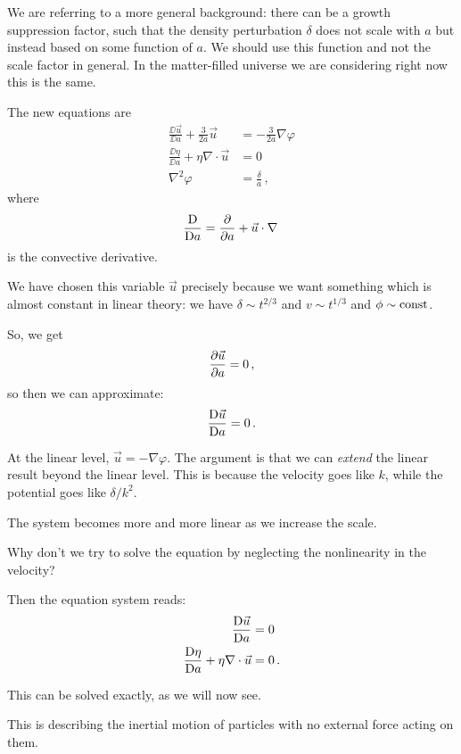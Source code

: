 \documentclass[main.tex]{subfiles}
\begin{document}
We are referring to a more general background: there can be a growth suppression factor, such that the density perturbation \(\delta \) does not scale with \(a\) but instead based on some function of \(a\). 
We should use this function and not the scale factor in general.
In the matter-filled universe we are considering right now this is the same.

The new equations are 
%
\begin{align}
\frac{ \DD \vec{u}}{\DD a} + \frac{3}{2a} \vec{u} &= - \frac{3}{2a} \nabla \varphi  \\
\frac{ \DD \eta }{\DD a} + \eta \nabla \cdot \vec{u} &= 0  \\
\nabla^2 \varphi &= \frac{\delta}{a}
\,,
\end{align}
%
where 
%
\begin{align}
\frac{\mathrm{D} }{\mathrm{D} a} = \pdv{}{a} + \vec{u} \cdot \nabla
\,
\end{align}
%
is the convective derivative.

We have chosen this variable \(\vec{u}\) precisely because we want something which is almost constant in linear theory: we have \(\delta \sim t^{2/3}\) and \(v \sim t^{1/3}\) and \(\phi \sim \text{const}\). 

So, we get 
%
\begin{align}
\pdv{\vec{u}}{a} = 0  
\,,
\end{align}
%
so then we can approximate:
%
\begin{align}
\frac{\mathrm{D} \vec{u}}{\mathrm{D} a} = 0 
\,.
\end{align}

At the linear level, \(\vec{u} = - \nabla \varphi \). 
The argument is that we can \emph{extend} the linear result beyond the linear level. This is because the velocity goes like \(k\), while the potential goes like \(\delta / k^2\).

The system becomes more and more linear as we increase the scale.

Why don't we try to solve the equation by neglecting the nonlinearity in the velocity? 

Then the equation system reads: 
%
\begin{align}
\frac{\mathrm{D} \vec{u}}{\mathrm{D} a} &= 0  \\
\frac{\mathrm{D} \eta }{\mathrm{D} a} + \eta \nabla \cdot \vec{u} &= 0 
\,.
\end{align}

This can be solved exactly, as we will now see.

This is describing the inertial motion of particles with no external force acting on them. 
\end{document}
